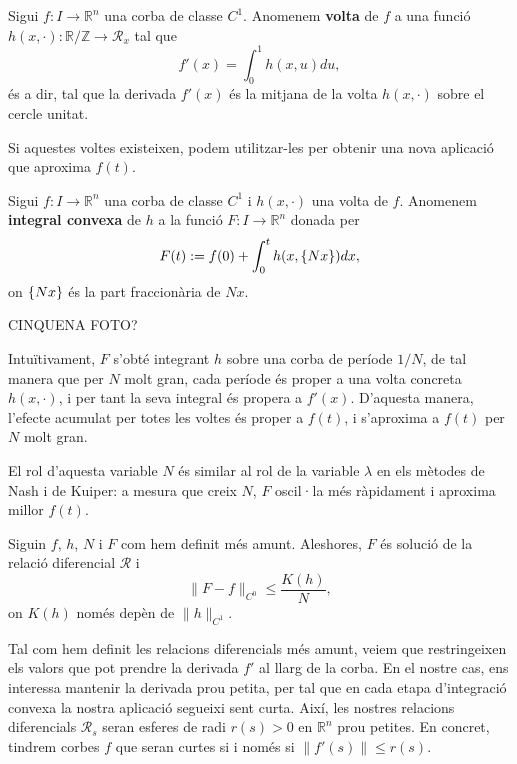 \begin{defi}
    Sigui $f:I\to\mathbb R^n$ una corba de classe $C^1$. Anomenem \textbf{volta} de $f$ a una funció $h(x, \cdot): \mathbb R / \mathbb Z \to \mathcal R_x$ tal que
    \begin{equation}\label{eq:def voltes}
        f'(x) = \int_0^1 h(x, u)  du,
    \end{equation}
    és a dir, tal que la derivada $f'(x)$ és la mitjana de la volta $h(x, \cdot)$ sobre el cercle unitat.
\end{defi}

Si aquestes voltes existeixen, podem utilitzar-les per obtenir una nova aplicació que aproxima $f(t)$.
\begin{defi}
    Sigui $f:I\to\mathbb R^n$ una corba de classe $C^1$ i $h(x, \cdot)$ una volta de $f$. Anomenem \textbf{integral convexa} de $h$ a la funció $F:I\to\mathbb R^n$ donada per
    \begin{equation*}
        F(t) := f(0) + \int_0^t h(x, \{Nx\})  dx,
    \end{equation*}
    on $\{Nx\}$ és la part fraccionària de $Nx$.
\end{defi}    

{\color{blue} CINQUENA FOTO?}

Intuïtivament, $F$ s'obté integrant $h$ sobre una corba de període $1/N$, de tal manera que per $N$ molt gran, cada període és proper a una volta concreta $h(x, \cdot)$, i per tant la seva integral és propera a $f'(x)$. D'aquesta manera, l'efecte acumulat per totes les voltes és proper a $f(t)$, i s'aproxima a $f(t)$ per $N$ molt gran. 
\begin{obs}
    El rol d'aquesta variable $N$ és similar al rol de la variable $\lambda$ en els mètodes de Nash i de Kuiper: a mesura que creix $N$, $F$ oscil·la més ràpidament i aproxima millor $f(t)$.
\end{obs}

\begin{lema}\label{lema:C0-1D}
    Siguin $f$, $h$, $N$ i $F$ com hem definit més amunt. Aleshores, $F$ és solució de la relació diferencial $\mathcal R$ i 
    \begin{equation}
    \|F-f\|_{C^0} \le \frac{K(h)}{N},
    \end{equation}
    on $K(h)$ només depèn de $\|h\|_{C^1}$.
\end{lema}

Tal com hem definit les relacions diferencials més amunt, veiem que restringeixen els valors que pot prendre la derivada $f'$ al llarg de la corba. En el nostre cas, ens interessa mantenir la derivada prou petita, per tal que en cada etapa d'integració convexa la nostra aplicació segueixi sent curta. Així, les nostres relacions diferencials $\mathcal R_s$ seran esferes de radi $r(s)>0$ en $\mathbb R^n$ prou petites. En concret, tindrem corbes $f$ que seran curtes si i només si $\|f'(s)\|\le r(s)$.

